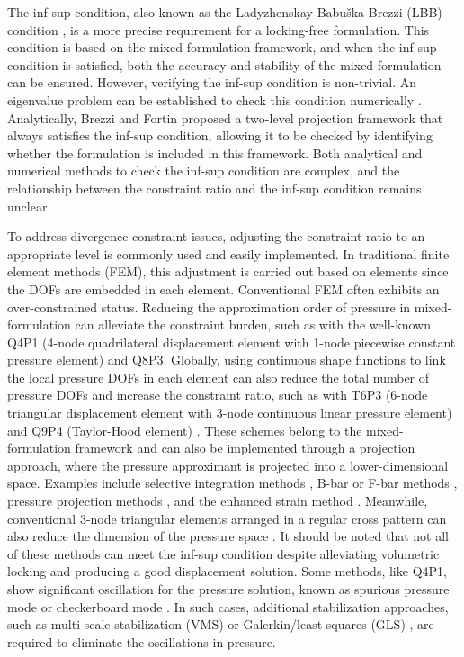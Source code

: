 The inf-sup condition, also known as the Ladyzhenskay-Babuška-Brezzi (LBB) condition \cite{babuska1997a,bathe1996}, is a more precise requirement for a locking-free formulation. This condition is based on the mixed-formulation framework, and when the inf-sup condition is satisfied, both the accuracy and stability of the mixed-formulation can be ensured. However, verifying the inf-sup condition is non-trivial. An eigenvalue problem can be established to check this condition numerically \cite{malkus1981,chapelle1993,brezzi0000,gallistl2019}. Analytically, Brezzi and Fortin proposed a two-level projection framework that always satisfies the inf-sup condition, allowing it to be checked by identifying whether the formulation is included in this framework. Both analytical and numerical methods to check the inf-sup condition are complex, and the relationship between the constraint ratio and the inf-sup condition remains unclear.

To address divergence constraint issues, adjusting the constraint ratio to an appropriate level is commonly used and easily implemented. In traditional finite element methods (FEM), this adjustment is carried out based on elements since the DOFs are embedded in each element. Conventional FEM often exhibits an over-constrained status. Reducing the approximation order of pressure in mixed-formulation can alleviate the constraint burden, such as with the well-known Q4P1 (4-node quadrilateral displacement element with 1-node piecewise constant pressure element) and Q8P3. Globally, using continuous shape functions to link the local pressure DOFs in each element can also reduce the total number of pressure DOFs and increase the constraint ratio, such as with T6P3 (6-node triangular displacement element with 3-node continuous linear pressure element) and Q9P4 (Taylor-Hood element) \cite{hood1974}. These schemes belong to the mixed-formulation framework and can also be implemented through a projection approach, where the pressure approximant is projected into a lower-dimensional space. Examples include selective integration methods \cite{malkus1978,shilt2020}, B-bar or F-bar methods \cite{simo1990,broccardo2009,coombs2018,saloustros2021,rodriguez2023}, pressure projection methods \cite{simo1985,dohrmann2004}, and the enhanced strain method \cite{lovadina2003}. Meanwhile, conventional 3-node triangular elements arranged in a regular cross pattern can also reduce the dimension of the pressure space \cite{bathe2001}. It should be noted that not all of these methods can meet the inf-sup condition despite alleviating volumetric locking and producing a good displacement solution. Some methods, like Q4P1, show significant oscillation for the pressure solution, known as spurious pressure mode or checkerboard mode \cite{bathe2001}. In such cases, additional stabilization approaches, such as multi-scale stabilization (VMS) \cite{hughes1995,masud2005,rossi2021,karabelas2022} or Galerkin/least-squares (GLS) \cite{hughes1986}, are required to eliminate the oscillations in pressure.

